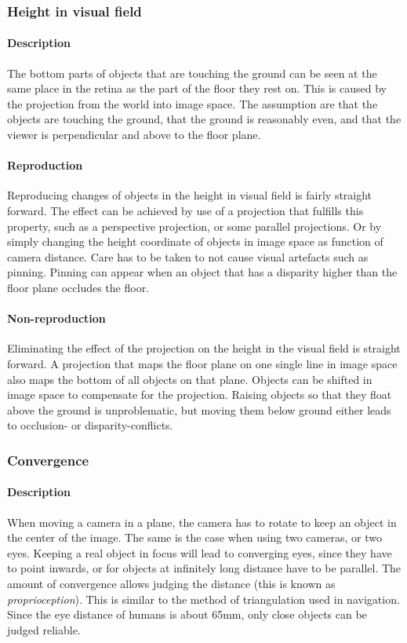 \subsubsection{Height in visual field}
\paragraph{Description}
The bottom parts of objects that are touching the ground can be seen at the same place in the retina as the part of the floor they rest on. This is caused by the projection from the world into image space. The assumption are that the objects are touching the ground, that the ground is reasonably even, and that the viewer is perpendicular and above to the floor plane.

\paragraph{Reproduction}
Reproducing changes of objects in the height in visual field is fairly straight forward.
The effect can be achieved by use of a projection that fulfills this property, such as a perspective projection, or some parallel projections.
Or by simply changing the height coordinate of objects in image space as function of camera distance.
Care has to be taken to not cause visual artefacts such as pinning.
Pinning can appear when an object that has a disparity higher than the floor plane occludes the floor.

\paragraph{Non-reproduction}
Eliminating the effect of the projection on the height in the visual field is straight forward.
A projection that maps the floor plane on one single line in image space also maps the bottom of all objects on that plane.
Objects can be shifted in image space to compensate for the projection.
Raising objects so that they float above the ground is unproblematic, but moving them below ground either leads to occlusion- or disparity-conflicts.


\subsubsection{Convergence}
\paragraph{Description}
When moving a camera in a plane, the camera has to rotate to keep an object in the center of the image.
The same is the case when using two cameras, or two eyes.
Keeping a real object in focus will lead to converging eyes, since they have to point inwards, or for objects at infinitely long distance have to be parallel.
The amount of convergence allows judging the distance (this is known as \textit{proprioception}).
This is similar to the method of triangulation\cite{triangulation} used in navigation.
Since the eye distance of humans is about 65mm, only close objects can be judged reliable.

